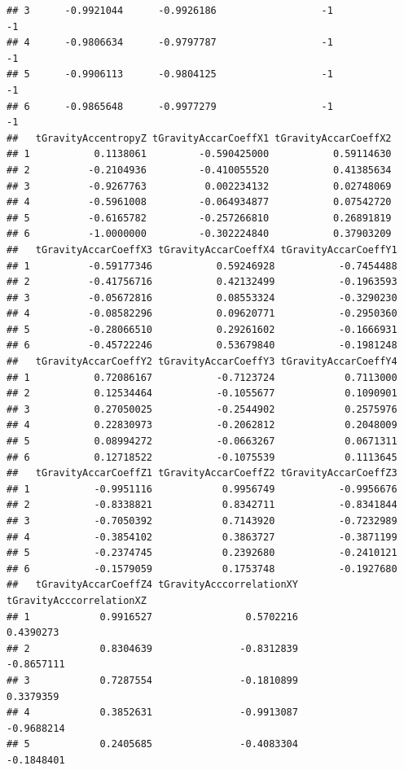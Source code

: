 \documentclass[
]{article}
\begin{document}
\begin{verbatim}
## 3      -0.9921044      -0.9926186                  -1                  -1
## 4      -0.9806634      -0.9797787                  -1                  -1
## 5      -0.9906113      -0.9804125                  -1                  -1
## 6      -0.9865648      -0.9977279                  -1                  -1
##   tGravityAccentropyZ tGravityAccarCoeffX1 tGravityAccarCoeffX2
## 1           0.1138061         -0.590425000           0.59114630
## 2          -0.2104936         -0.410055520           0.41385634
## 3          -0.9267763          0.002234132           0.02748069
## 4          -0.5961008         -0.064934877           0.07542720
## 5          -0.6165782         -0.257266810           0.26891819
## 6          -1.0000000         -0.302224840           0.37903209
##   tGravityAccarCoeffX3 tGravityAccarCoeffX4 tGravityAccarCoeffY1
## 1          -0.59177346           0.59246928           -0.7454488
## 2          -0.41756716           0.42132499           -0.1963593
## 3          -0.05672816           0.08553324           -0.3290230
## 4          -0.08582296           0.09620771           -0.2950360
## 5          -0.28066510           0.29261602           -0.1666931
## 6          -0.45722246           0.53679840           -0.1981248
##   tGravityAccarCoeffY2 tGravityAccarCoeffY3 tGravityAccarCoeffY4
## 1           0.72086167           -0.7123724            0.7113000
## 2           0.12534464           -0.1055677            0.1090901
## 3           0.27050025           -0.2544902            0.2575976
## 4           0.22830973           -0.2062812            0.2048009
## 5           0.08994272           -0.0663267            0.0671311
## 6           0.12718522           -0.1075539            0.1113645
##   tGravityAccarCoeffZ1 tGravityAccarCoeffZ2 tGravityAccarCoeffZ3
## 1           -0.9951116            0.9956749           -0.9956676
## 2           -0.8338821            0.8342711           -0.8341844
## 3           -0.7050392            0.7143920           -0.7232989
## 4           -0.3854102            0.3863727           -0.3871199
## 5           -0.2374745            0.2392680           -0.2410121
## 6           -0.1579059            0.1753748           -0.1927680
##   tGravityAccarCoeffZ4 tGravityAcccorrelationXY tGravityAcccorrelationXZ
## 1            0.9916527                0.5702216                0.4390273
## 2            0.8304639               -0.8312839               -0.8657111
## 3            0.7287554               -0.1810899                0.3379359
## 4            0.3852631               -0.9913087               -0.9688214
## 5            0.2405685               -0.4083304               -0.1848401

\end{verbatim}
\end{document}
